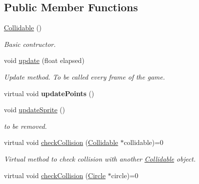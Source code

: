 \subsection*{Public Member Functions}
\begin{DoxyCompactItemize}
\item 
\hyperlink{class_collidable_a92ce9e2b08086bb2f466168ffc69c9ed}{Collidable} ()
\begin{DoxyCompactList}\small\item\em Basic contructor. \end{DoxyCompactList}\item 
\hypertarget{class_collidable_ad636cf1a7fab85fb2dfedf08c02c7745}{}void \hyperlink{class_collidable_ad636cf1a7fab85fb2dfedf08c02c7745}{update} (float elapsed)\label{class_collidable_ad636cf1a7fab85fb2dfedf08c02c7745}

\begin{DoxyCompactList}\small\item\em Update method. To be called every frame of the game. \end{DoxyCompactList}\item 
\hypertarget{class_collidable_abeb14a34d7c7dc47b0c3c51a25a44e64}{}virtual void {\bfseries update\+Points} ()\label{class_collidable_abeb14a34d7c7dc47b0c3c51a25a44e64}

\item 
void \hyperlink{class_collidable_a656ce92dd3e3f1b1981eb79c97ed3115}{update\+Sprite} ()
\begin{DoxyCompactList}\small\item\em to be removed. \end{DoxyCompactList}\item 
\hypertarget{class_collidable_a25c916c15277425a1b2606d35c7405fe}{}virtual void \hyperlink{class_collidable_a25c916c15277425a1b2606d35c7405fe}{check\+Collision} (\hyperlink{class_collidable}{Collidable} $\ast$collidable)=0\label{class_collidable_a25c916c15277425a1b2606d35c7405fe}

\begin{DoxyCompactList}\small\item\em Virtual method to check collision with another \hyperlink{class_collidable}{Collidable} object. \end{DoxyCompactList}\item 
\hypertarget{class_collidable_a157281cb33cb695c8eb0c8dd971b84f2}{}virtual void \hyperlink{class_collidable_a157281cb33cb695c8eb0c8dd971b84f2}{check\+Collision} (\hyperlink{class_circle}{Circle} $\ast$circle)=0\label{class_collidable_a157281cb33cb695c8eb0c8dd971b84f2}


\end{DoxyCompactItemize}

